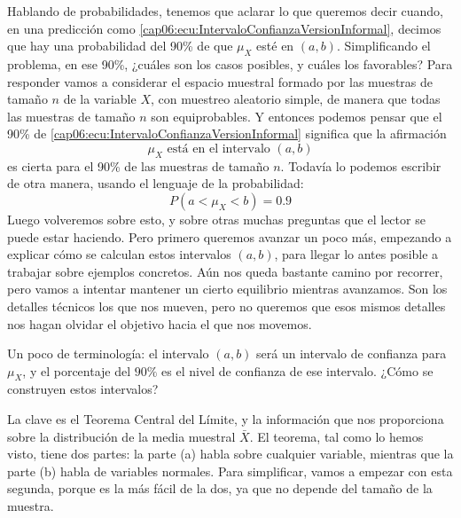 Hablando de probabilidades, tenemos que aclarar lo que queremos decir cuando,
en una predicción como \ref{cap06:ecu:IntervaloConfianzaVersionInformal},
decimos que hay una probabilidad del 90\% de que $\mu_X$ esté en $(a,b)$.
Simplificando el problema, en ese 90\%, ¿cuáles son los casos posibles, y
cuáles los favorables? Para responder vamos a considerar el espacio muestral
formado por las muestras de tamaño $n$ de la variable $X$, con muestreo
aleatorio simple, de manera que todas las muestras de tamaño $n$ son
equiprobables. Y entonces podemos pensar que el 90\% de
\ref{cap06:ecu:IntervaloConfianzaVersionInformal} significa que la afirmación
\[\mu_X\mbox{ está en el intervalo }(a,b)\]
es cierta para el 90\% de las muestras de tamaño $n$. Todavía lo podemos
escribir de otra manera, usando el lenguaje de la probabilidad:
\begin{equation}\label{cap06:ecu:IntervaloConfianzaLenguajeProbabilidad}
P\left(a<\mu_X<b\right)=0.9
\end{equation}
Luego volveremos sobre esto, y sobre otras muchas preguntas que el lector se
puede estar haciendo. Pero primero queremos avanzar un poco más, empezando a
explicar cómo se calculan estos intervalos $(a,b)$, para llegar lo antes
posible a trabajar sobre ejemplos concretos. Aún nos queda bastante camino por
recorrer, pero vamos a intentar mantener un cierto equilibrio mientras
avanzamos. Son los detalles técnicos los que nos mueven, pero no queremos que
esos mismos detalles nos hagan olvidar el objetivo hacia el que nos movemos.

Un poco de terminología: el intervalo $(a,b)$ será un {\sf intervalo de
confianza} para
$\mu_X$, y el porcentaje del $90\%$ es el {\sf nivel de confianza} de ese intervalo. ¿Cómo se construyen estos intervalos?

La clave es el Teorema Central del Límite, y la información que nos proporciona
sobre la distribución de la media muestral $\bar X$. El teorema, tal como lo
hemos visto, tiene dos partes: la parte (a) habla sobre cualquier variable,
mientras que la parte (b) habla de variables normales. Para simplificar, vamos
a empezar con esta segunda, porque es la más fácil de la dos, ya que no depende
del tamaño de la muestra.

